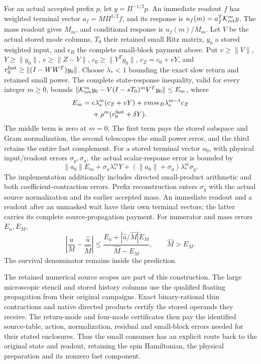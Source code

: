 For an actual accepted prefix \(p\), let \(y=\Pi^{-1/2}p\).
An immediate readout \(f\) has weighted terminal vector
\(a_f=M\Pi^{1/2}f\), and its response is
\(u_f(m)=a_f^T\mathcal K_{\rm ret}^my\). The mass readout gives
\(M_m\), and conditional response is \(u_f(m)/M_m\).
Let \(V\) be the actual stored mode columns, \(T_0\) their retained
small Ritz matrix, \(y_0\) a stored weighted input, and
\(\epsilon_B\) the complete small-block payment above. Put
\(v\geq\|V\|\), \(Y\geq\|y_0\|\), \(e\geq\|Z-V\|\),
\(c_0\geq\|V^Ty_0\|\), \(c_Z=c_0+eY\), and
\(r_0^{\rm fast}\geq\|(I-WW^T)y_0\|\).
Choose \(\lambda_*<1\) bounding the exact slow return and retained small
power. The complete state-response inequality, valid for every integer
\(m\geq0\), bounds
\(\|\mathcal K_{\rm ret}^my_0-V(I-sT_0)^mV^Ty_0\|\leq E_m\), where
\[
\begin{split}
 E_m={}&e\lambda_*^m(c_Z+vY)
       +vms\epsilon_B\lambda_*^{m-1}c_Z\\
       &+\rho^m(r_0^{\rm fast}+\delta Y).
\end{split}
\]
The middle term is zero at \(m=0\). The first term pays the stored
subspace and Gram normalization, the second telescopes the small
power error, and the third retains the entire fast complement.
For a stored terminal vector \(a_0\), with physical input/readout
errors \(\sigma_y,\sigma_a\), the actual scalar-response error is bounded by
\[
 \|a_0\|E_m+\sigma_a\lambda_*^mY
       +(\|a_0\|+\sigma_a)\lambda_*^m\sigma_y.
\]
The implementation additionally includes directed small-product
arithmetic and both coefficient-contraction errors. Prefix
reconstruction enters \(\sigma_y\) with the actual source
normalization and its earlier accepted mass. An immediate readout and
a readout after an unmasked wait have their own terminal vectors;
the latter carries its complete source-propagation payment.
For numerator and mass errors \(E_u,E_M\),
\[
 \left|\frac{u}{M}-\frac{\widehat u}{\widehat M}\right|
 \leq
 \frac{E_u+|\widehat u/\widehat M|E_M}{\widehat M-E_M},
 \qquad\widehat M>E_M.
\]
The survival denominator remains inside the prediction.

The retained numerical source scopes are part of this construction.
The large microscopic stencil and stored history columns use the
qualified floating propagation from their original campaigns. Exact
binary-rational thin contractions and native directed products certify
the stored operands they receive. The return-mode and four-mode
certificates then pay the identified source-table, action, normalization,
residual and small-block errors needed for their stated enclosures.
Thus the small consumer has an explicit route back to the original
state and readout, retaining the spin Hamiltonian, the physical
preparation and its nonzero fast component.

